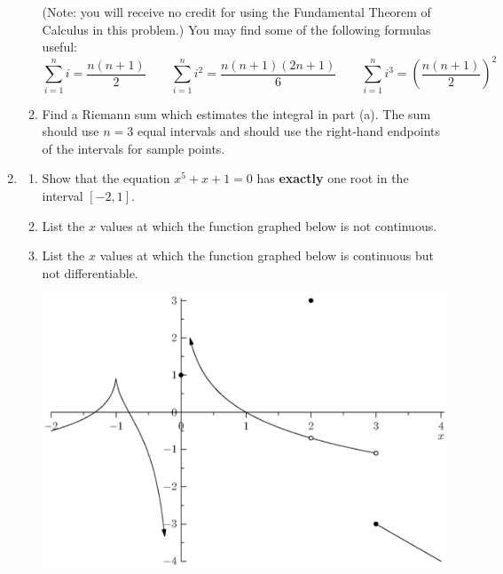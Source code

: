 \documentclass[12pt]{article}
\begin{document}
\begin{enumerate}
\begin{enumerate}
    (Note: you will receive no credit for 
    using the Fundamental Theorem of Calculus in this problem.)
    You may find some of the following formulas useful:
    \begin{displaymath}
      \sum_{i=1}^n i = \frac{n(n+1)}{2}
      \qquad
      \sum_{i=1}^n i^2 = \frac{n(n+1)(2n+1)}{6}
      \qquad
      \sum_{i=1}^n i^3 = \left(\frac{n(n+1)}{2}\right)^2
    \end{displaymath}
  \item Find a Riemann sum which estimates the integral in part (a).
    The sum should use $n=3$ equal intervals and should 
    use the right-hand endpoints of the intervals for sample points.
\vfill
  \end{enumerate}
\newpage
\item
  \begin{enumerate}
  \item Show
    that the equation $x^5+x+1 = 0$ has 
    \textbf{exactly} 
    one root in the interval $[-2,1]$.
\vfill
\vfill
\vfill
\vfill
  \item List the $x$ values at which the function graphed below 
    is not continuous.
\vfill
  \item List the $x$ values at which the function graphed below
    is continuous but not differentiable.
\vfill
    \begin{center}
      \includegraphics[width=6in]{cont.eps}
    \end{center}
  \end{enumerate}
\end{enumerate}
\end{document}
